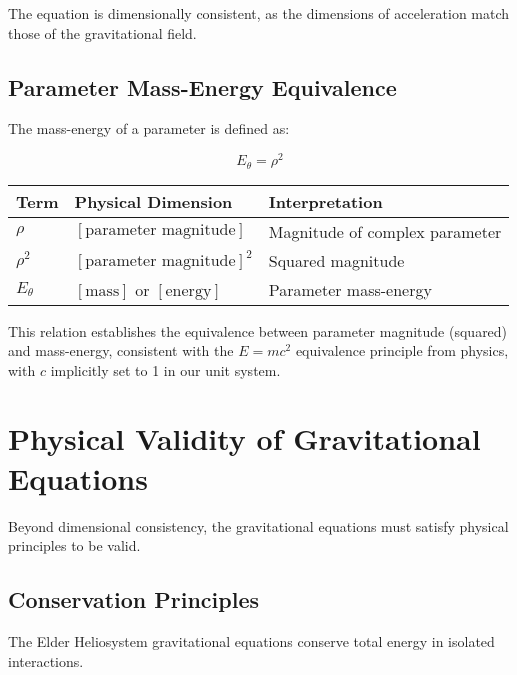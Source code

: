 The equation is dimensionally consistent, as the dimensions of acceleration match those of the gravitational field.

\subsection{Parameter Mass-Energy Equivalence}

The mass-energy of a parameter is defined as:

\begin{equation}
E_{\theta} = \rho^2
\end{equation}

\begin{center}
\label{tab:dimensional_analysis_mass_energy}
\begin{tabular}{p{3cm} p{5cm} p{6cm}}
\textbf{Term} & \textbf{Physical Dimension} & \textbf{Interpretation} \\
\hline
$\rho$ & $[\text{parameter magnitude}]$ & Magnitude of complex parameter \\
$\rho^2$ & $[\text{parameter magnitude}]^2$ & Squared magnitude \\
$E_{\theta}$ & $[\text{mass}]$ or $[\text{energy}]$ & Parameter mass-energy \\
\hline
\end{tabular}
\end{center}

This relation establishes the equivalence between parameter magnitude (squared) and mass-energy, consistent with the $E = mc^2$ equivalence principle from physics, with $c$ implicitly set to 1 in our unit system.

\section{Physical Validity of Gravitational Equations}

Beyond dimensional consistency, the gravitational equations must satisfy physical principles to be valid.

\subsection{Conservation Principles}

\begin{theorem}
The Elder Heliosystem gravitational equations conserve total energy in isolated interactions.
\end{theorem}

